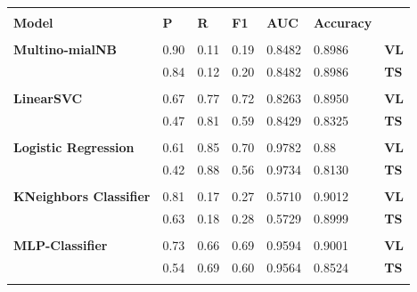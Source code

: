 \documentclass[10.5pt]{article}
\begin{document}
\begin{center}
\centering
\begin{tabularx}{\textwidth}{Y |YYYYY|Y}

\hline\hline \\

\textbf{Model} & \textbf{P} & \textbf{R} & \textbf{F1} & \textbf{AUC} & \textbf{Accuracy} & {} \vspace{0.2cm} \\
    
\hline\\

\textbf{Multino-mialNB} & 0.90 & 0.11 & 0.19 & 0.8482 & 0.8986 & \textbf{VL} \\
 & 0.84 & 0.12 & 0.20 & 0.8482 & 0.8986 & \textbf{TS} \vspace{0.1cm}\\
 
\hline\\

\textbf{LinearSVC} & 0.67 & 0.77 & 0.72 & 0.8263 & 0.8950 & \textbf{VL} \\
 & 0.47 & 0.81 & 0.59 & 0.8429 & 0.8325 & \textbf{TS} \vspace{0.1cm}\\
 
\hline\\

\textbf{Logistic Regression} & 0.61 & 0.85 & 0.70 & 0.9782 & 0.88 & \textbf{VL} \\
 & 0.42 & 0.88 & 0.56 & 0.9734 & 0.8130 & \textbf{TS} \vspace{0.1cm}\\

\hline\\

\textbf{KNeighbors Classifier} & 0.81 & 0.17 & 0.27 & 0.5710 & 0.9012 & \textbf{VL} \\
 & 0.63 & 0.18 & 0.28 & 0.5729 & 0.8999 & \textbf{TS} \vspace{0.1cm}\\

\hline\\

\textbf{MLP-Classifier} & 0.73 & 0.66 & 0.69 & 0.9594 & 0.9001 & \textbf{VL} \\
 & 0.54 & 0.69 & 0.60 & 0.9564 & 0.8524 & \textbf{TS} \vspace{0.1cm}\\ 

\hline\\


\end{tabularx}
\end{center}
\end{document}
